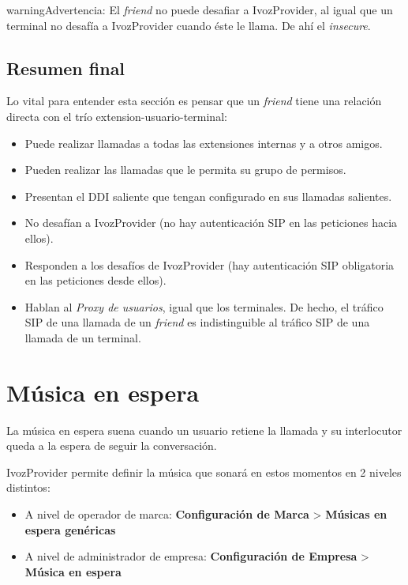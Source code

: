 \documentclass[letterpaper,10pt,spanish]{sphinxmanual}
\begin{document}
\begin{notice}{warning}{Advertencia:}
El \emph{friend} no puede desafiar a IvozProvider, al igual que un terminal no desafía a IvozProvider cuando éste le llama. De ahí el \emph{insecure}.
\end{notice}


\subsection{Resumen final}
\label{pbx_features/friends:summary}
Lo vital para entender esta sección es pensar que un \emph{friend} tiene una relación directa con el trío extension-usuario-terminal:
\begin{itemize}
\item {} 
Puede realizar llamadas a todas las extensiones internas y a otros amigos.

\item {} 
Pueden realizar las llamadas que le permita su grupo de permisos.

\item {} 
Presentan el DDI saliente que tengan configurado en sus llamadas salientes.

\item {} 
No desafían a IvozProvider (no hay autenticación SIP en las peticiones hacia ellos).

\item {} 
Responden a los desafíos de IvozProvider (hay autenticación SIP obligatoria en las peticiones desde ellos).

\item {} 
Hablan al \emph{Proxy de usuarios}, igual que los terminales. De hecho, el tráfico SIP de una llamada de un \emph{friend} es indistinguible al tráfico SIP de una llamada de un terminal.

\end{itemize}


\section{Música en espera}
\label{pbx_features/music_on_hold:music-on-hold}\label{pbx_features/music_on_hold::doc}\label{pbx_features/music_on_hold:musiconhold}
La música en espera suena cuando un usuario retiene la llamada y su interlocutor queda a la espera de seguir la conversación.

IvozProvider permite definir la música que sonará en estos momentos en 2 niveles distintos:
\begin{itemize}
\item {} 
A nivel de operador de marca: \textbf{Configuración de Marca} \textgreater{} \textbf{Músicas en espera genéricas}

\item {} 
A nivel de administrador de empresa: \textbf{Configuración de Empresa} \textgreater{} \textbf{Música en espera}

\end{itemize}
\end{document}
